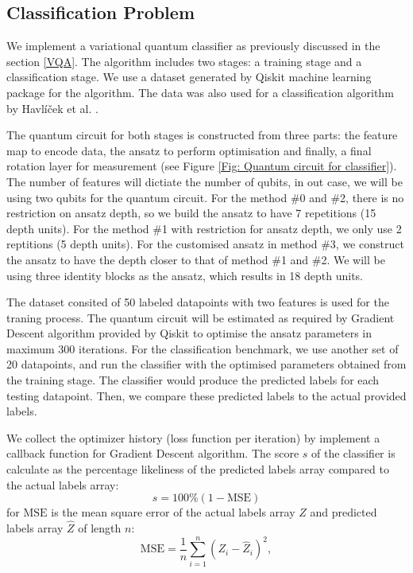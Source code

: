 \subsection{Classification Problem} \label{Sec: Classification Problem}
We implement a variational quantum classifier as previously discussed in the section \ref{VQA}.
The algorithm includes two stages: a training stage and a classification stage.
We use a dataset generated by Qiskit machine learning package for the algorithm.
The data was also used for a classification algorithm by Havlíček et al. \cite{havlicekSupervisedLearningQuantumenhanced2019}.

The quantum circuit for both stages is constructed from three parts: the feature map to encode data, the ansatz to perform optimisation and finally, a final rotation layer for measurement (see Figure \ref{Fig: Quantum circuit for classifier}).
The number of features will dictiate the number of qubits, in out case, we will be using two qubits for the quantum circuit.
For the method \#0 and \#2, there is no restriction on ansatz depth, so we build the ansatz to have 7 repetitions (15 depth units).
For the method \#1 with restriction for ansatz depth, we only use 2 reptitions (5 depth units).
For the customised ansatz in method \#3, we construct the ansatz to have the depth closer to that of method \#1 and \#2. We will be using three identity blocks as the ansatz, which results in 18 depth units.

The dataset consited of 50 labeled datapoints with two features is used for the traning process.
The quantum circuit will be estimated as required by Gradient Descent algorithm provided by Qiskit to optimise the ansatz parameters in maximum 300 iterations.
For the classification benchmark, we use another set of 20 datapoints, and run the classifier with the optimised parameters obtained from the training stage.
The classifier would produce the predicted labels for each testing datapoint.
Then, we compare these predicted labels to the actual provided labels.

We collect the optimizer history (loss function per iteration) by implement a callback function for Gradient Descent algorithm.
The score $s$ of the classifier is calculate as the percentage likeliness of the predicted labels array compared to the actual labels array:
\begin{equation}
    s = 100\% (1 - \text{MSE})
\end{equation}
for $\text{MSE}$ is the mean square error of the actual labels array $Z$ and predicted labels array $\hat{Z}$ of length $n$:
\begin{equation}
    \text{MSE} = \frac{1}{n}\sum^n_{i=1}(Z_i - \hat{Z}_i)^2,
\end{equation}



